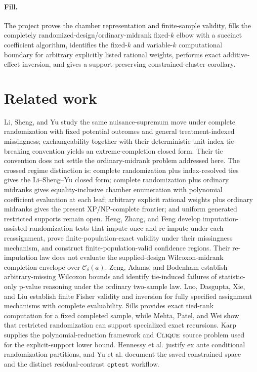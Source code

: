 \documentclass{article}
\begin{document}
\paragraph{Fill.} The project proves the chamber representation and finite-sample validity, fills the completely randomized-design/ordinary-midrank fixed-\(k\) elbow with a succinct coefficient algorithm, identifies the fixed-\(k\) and variable-\(k\) computational boundary for arbitrary explicitly listed rational weights, performs exact additive-effect inversion, and gives a support-preserving constrained-cluster corollary.

\section{Related work}

Li, Sheng, and Yu study the same nuisance-supremum move under complete randomization with fixed potential outcomes and general treatment-indexed missingness; exchangeability together with their deterministic unit-index tie-breaking convention yields an extreme-completion closed form. Their tie convention does not settle the ordinary-midrank problem addressed here. The crossed regime distinction is: complete randomization plus index-resolved ties gives the Li--Sheng--Yu closed form; complete randomization plus ordinary midranks gives equality-inclusive chamber enumeration with polynomial coefficient evaluation at each leaf; arbitrary explicit rational weights plus ordinary midranks gives the present \(\mathrm{XP}\)/NP-complete frontier; and uniform generated restricted supports remain open. Heng, Zhang, and Feng develop imputation-assisted randomization tests that impute once and re-impute under each reassignment, prove finite-population-exact validity under their missingness mechanism, and construct finite-population-valid confidence regions. Their re-imputation law does not evaluate the supplied-design Wilcoxon-midrank completion envelope over \(\mathcal C_\delta(a)\). Zeng, Adams, and Bodenham establish arbitrary-missing Wilcoxon bounds and identify tie-induced failures of statistic-only p-value reasoning under the ordinary two-sample law. Luo, Dasgupta, Xie, and Liu establish finite Fisher validity and inversion for fully specified assignment mechanisms with complete evaluability. Sills provides exact tied-rank computation for a fixed completed sample, while Mehta, Patel, and Wei show that restricted randomization can support specialized exact recursions. Karp supplies the polynomial-reduction framework and \(\textsc{Clique}\) source problem used for the explicit-support lower bound. Hennessy et al. justify ex ante conditional randomization partitions, and Yu et al. document the saved constrained space and the distinct residual-contrast \(\texttt{cptest}\) workflow.
\end{document}
